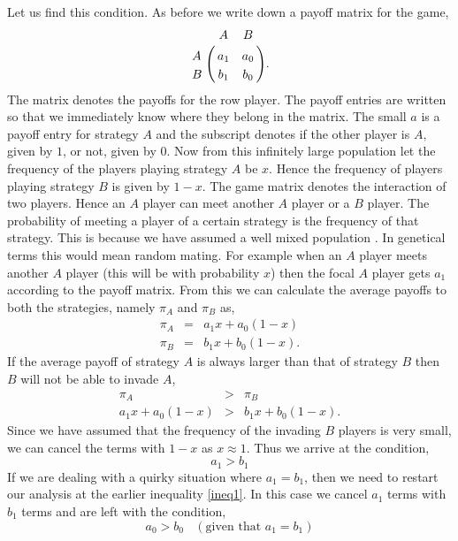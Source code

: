 \documentclass[oneside,11pt,a4paper]{book}
\begin{document}
Let us find this condition.
As before we write down a payoff matrix for the game,
%
\begin{eqnarray}
\label{eq:paymat}
\bordermatrix{
&A&B\cr
A&a_1 & a_0\cr
B& b_1 & b_0
}.
\end{eqnarray}
%
The matrix denotes the payoffs for the row player.
The payoff entries are written so that we immediately know where they belong in the matrix.
The small $a$ is a payoff entry for strategy $A$ and the subscript denotes if the other player is $A$, given by $1$, or not, given by $0$.
Now from this infinitely large population let the frequency of the players playing strategy $A$ be $x$.
Hence the frequency of players playing strategy $B$ is given by $1-x$.
The game matrix denotes the interaction of two players.
Hence an $A$ player can meet another $A$ player or a $B$ player.
The probability of meeting a player of a certain strategy is the frequency of that strategy.
This is because we have assumed a well mixed population \citep{maynard-smith:1973to}.
In genetical terms this would mean random mating.
For example when an $A$ player meets another $A$ player (this will be with probability $x$) then the focal $A$ player gets $a_1$ according to the payoff matrix.
From this we can calculate the average payoffs to both the strategies, namely $\pi_A$ and $\pi_B$ as,
%
\begin{eqnarray}
\label{infinitepayoffs}
\pi_A &=& a_1 x + a_0 (1-x) \\
\pi_B &=& b_1 x + b_0 (1-x) .
\end{eqnarray}
%
If the average payoff of strategy $A$ is always larger than that of strategy $B$ then $B$ will not be able to invade $A$,
%
\begin{eqnarray}
\pi_A &>& \pi_B \nonumber \\
a_1 x + a_0 (1-x) &>& b_1 x + b_0 (1-x).
\label{ineq1}
\end{eqnarray}
%
Since we have assumed that the frequency of the invading $B$ players is very small, we can cancel the terms with $1-x$ as $x \approx 1$.
Thus we arrive at the condition,
%
\begin{equation}
a_1 > b_1
\end{equation}
%
If we are dealing with a quirky situation where $a_1 = b_1$, then we need to restart our analysis at the earlier inequality \eqref{ineq1}.
In this case we cancel $a_1$ terms with $b_1$ terms and are left with the condition,
%
\begin{equation}
a_0 > b_0 \ \ \ \ (\text{given that } a_1 = b_1)
\end{equation}
\end{document}
